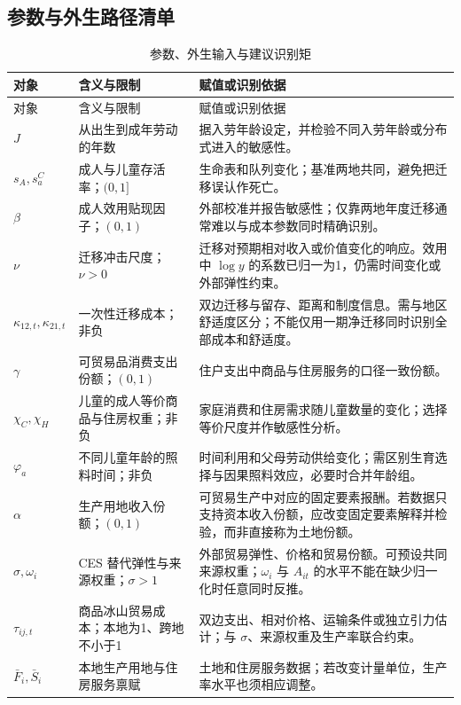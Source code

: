 \documentclass[UTF8,a4paper,zihao=-4,fontset=windows]{ctexart}
\numberwithin{equation}{section}
\begin{document}
\subsection{参数与外生路径清单}
\small
\begin{longtable}{L{0.17\textwidth}L{0.35\textwidth}L{0.38\textwidth}}
\caption{参数、外生输入与建议识别矩}\label{tab:parameters}\\
\toprule
对象 & 含义与限制 & 赋值或识别依据\\
\midrule
\endfirsthead
\toprule
对象 & 含义与限制 & 赋值或识别依据\\
\midrule
\endhead
\bottomrule
\endfoot
$J$ & 从出生到成年劳动的年数 & 据入劳年龄设定，并检验不同入劳年龄或分布式进入的敏感性。\\
$s_A,s^C_a$ & 成人与儿童存活率；$(0,1]$ & 生命表和队列变化；基准两地共同，避免把迁移误认作死亡。\\
$\beta$ & 成人效用贴现因子；$(0,1)$ & 外部校准并报告敏感性；仅靠两地年度迁移通常难以与成本参数同时精确识别。\\
$\nu$ & 迁移冲击尺度；$\nu>0$ & 迁移对预期相对收入或价值变化的响应。效用中 $\log y$ 的系数已归一为1，仍需时间变化或外部弹性约束。\\
$\kappa_{12,t},\kappa_{21,t}$ & 一次性迁移成本；非负 & 双边迁移与留存、距离和制度信息。需与地区舒适度区分；不能仅用一期净迁移同时识别全部成本和舒适度。\\
$\gamma$ & 可贸易品消费支出份额；$(0,1)$ & 住户支出中商品与住房服务的口径一致份额。\\
$\chi_C,\chi_H$ & 儿童的成人等价商品与住房权重；非负 & 家庭消费和住房需求随儿童数量的变化；选择等价尺度并作敏感性分析。\\
$\varphi_a$ & 不同儿童年龄的照料时间；非负 & 时间利用和父母劳动供给变化；需区别生育选择与因果照料效应，必要时合并年龄组。\\
$\alpha$ & 生产用地收入份额；$(0,1)$ & 可贸易生产中对应的固定要素报酬。若数据只支持资本收入份额，应改变固定要素解释并检验，而非直接称为土地份额。\\
$\sigma,\omega_i$ & CES 替代弹性与来源权重；$\sigma>1$ & 外部贸易弹性、价格和贸易份额。可预设共同来源权重；$\omega_i$ 与 $A_{it}$ 的水平不能在缺少归一化时任意同时反推。\\
$\tau_{ij,t}$ & 商品冰山贸易成本；本地为1、跨地不小于1 & 双边支出、相对价格、运输条件或独立引力估计；与 $\sigma$、来源权重及生产率联合约束。\\
$\bar F_i,\bar S_i$ & 本地生产用地与住房服务禀赋 & 土地和住房服务数据；若改变计量单位，生产率水平也须相应调整。\\

\end{longtable}
\end{document}

